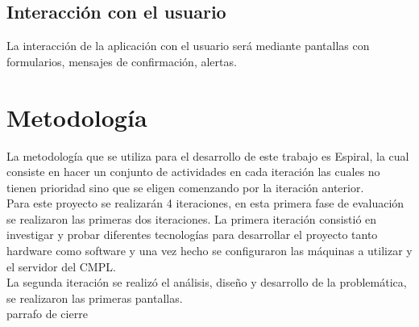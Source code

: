 \subsection{Interacción con el usuario}

La interacción de la aplicación con el usuario será mediante pantallas con formularios, mensajes de confirmación, alertas. 

\section{Metodología}

La metodología que se utiliza para el desarrollo de este trabajo es Espiral, la cual consiste en hacer un conjunto de actividades en cada iteración las cuales no tienen prioridad sino que se eligen comenzando por la iteración anterior.\\

Para este proyecto se realizarán 4 iteraciones, en esta primera fase de evaluación se realizaron las primeras dos iteraciones. La primera iteración consistió en investigar y probar  diferentes tecnologías para desarrollar el proyecto tanto hardware como software y una vez hecho se configuraron las máquinas a utilizar y el servidor del CMPL. \\
La segunda iteración se realizó el análisis, diseño y desarrollo de la problemática, se realizaron las primeras pantallas.\\

parrafo de cierre 

